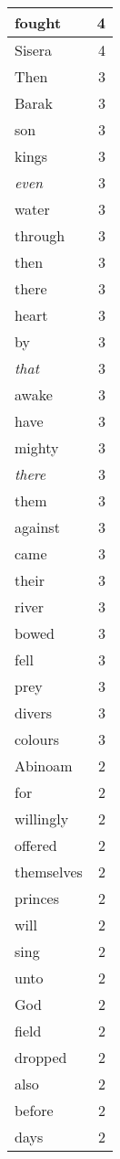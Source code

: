 \begin{center}
\begin{longtable}{l|r}
fought & 4\\ \hline 
Sisera & 4\\ \hline 
Then & 3\\ \hline 
Barak & 3\\ \hline 
son & 3\\ \hline 
kings & 3\\ \hline 
\emph{even} & 3\\ \hline 
water & 3\\ \hline 
through & 3\\ \hline 
then & 3\\ \hline 
there & 3\\ \hline 
heart & 3\\ \hline 
by & 3\\ \hline 
\emph{that} & 3\\ \hline 
awake & 3\\ \hline 
have & 3\\ \hline 
mighty & 3\\ \hline 
\emph{there} & 3\\ \hline 
them & 3\\ \hline 
against & 3\\ \hline 
came & 3\\ \hline 
their & 3\\ \hline 
river & 3\\ \hline 
bowed & 3\\ \hline 
fell & 3\\ \hline 
prey & 3\\ \hline 
divers & 3\\ \hline 
colours & 3\\ \hline 
Abinoam & 2\\ \hline 
for & 2\\ \hline 
willingly & 2\\ \hline 
offered & 2\\ \hline 
themselves & 2\\ \hline 
princes & 2\\ \hline 
will & 2\\ \hline 
sing & 2\\ \hline 
unto & 2\\ \hline 
God & 2\\ \hline 
field & 2\\ \hline 
dropped & 2\\ \hline 
also & 2\\ \hline 
before & 2\\ \hline 
days & 2\\ \hline 

\end{longtable}
\end{center}
